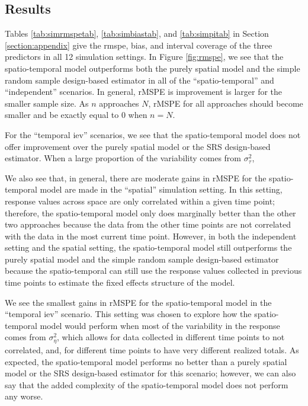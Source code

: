 \documentclass[]{interact}
\theoremstyle{plain}%
\theoremstyle{definition}
\theoremstyle{remark}
\begin{document}
\subsection{Results}

Tables \ref{tab:simrmspetab}, \ref{tab:simbiastab}, and
\ref{tab:simpitab} in Section \ref{section:appendix} give the rmspe,
bias, and interval coverage of the three predictors in all 12 simulation
settings. In Figure \ref{fig:rmspe}, we see that the spatio-temporal
model outperforms both the purely spatial model and the simple random
sample design-based estimator in all of the ``spatio-temporal'' and
``independent'' scenarios. In general, rMSPE is improvement is larger
for the smaller sample size. As \(n\) approaches \(N\), rMSPE for all
approaches should become smaller and be exactly equal to 0 when
\(n = N\).

For the ``temporal iev'' scenarios, we see that the spatio-temporal
model does not offer improvement over the purely spatial model or the
SRS design-based estimator. When a large proportion of the variability
comes from \(\sigma^2_{\tau}\),

We also see that, in general, there are moderate gains in rMSPE for the
spatio-temporal model are made in the ``spatial'' simulation setting. In
this setting, response values across space are only correlated within a
given time point; therefore, the spatio-temporal model only does
marginally better than the other two approaches because the data from
the other time points are not correlated with the data in the most
current time point. However, in both the independent setting and the
spatial setting, the spatio-temporal model still outperforms the purely
spatial model and the simple random sample design-based estimator
because the spatio-temporal can still use the response values collected
in previous time points to estimate the fixed effects structure of the
model.

We see the smallest gains in rMSPE for the spatio-temporal model in the
``temporal iev'' scenario. This setting was chosen to explore how the
spatio-temporal model would perform when most of the variability in the
response comes from \(\sigma^2_{\eta}\), which allows for data collected
in different time points to not correlated, and, for different time
points to have very different realized totals. As expected, the
spatio-temporal model performs no better than a purely spatial model or
the SRS design-based estimator for this scenario; however, we can also
say that the added complexity of the spatio-temporal model does not
perform any worse.
\end{document}
